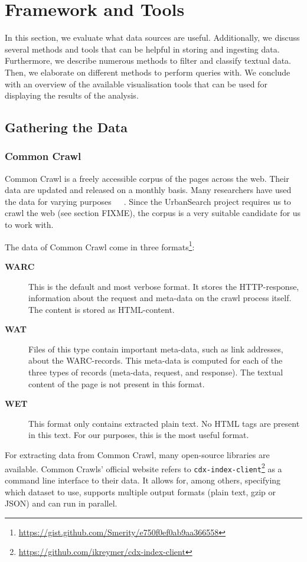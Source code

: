 \section{Framework and Tools}
In this section, we evaluate what data sources are useful. Additionally, we discuss several methods and tools that can be helpful in storing and ingesting data. Furthermore, we describe numerous methods to filter and classify textual data. Then, we elaborate on different methods to perform queries with. We conclude with an overview of the available visualisation tools that can be used for displaying the results of the analysis.

\subsection{Gathering the Data}

\subsubsection{Common Crawl}
Common Crawl \cite{commoncrawl} is a freely accessible corpus of the pages across the web. Their data are updated and released on a monthly basis. Many researchers have used the data for varying purposes~\cite{smith2013dirt}~\cite{muhleisen2012web}~\cite{singh2012wikilinks}. Since the UrbanSearch project requires us to crawl the web (see section {\color{red} FIXME}), the corpus is a very suitable candidate for us to work with.

The data of Common Crawl come in three formats\footnote{\url{https://gist.github.com/Smerity/e750f0ef0ab9aa366558}}: 
\begin{description}
\item[\textbf{WARC}] This is the default and most verbose format. It stores the HTTP-response, information about the request and meta-data on the crawl process itself. The content is stored as HTML-content.
\item[\textbf{WAT}] Files of this type contain important meta-data, such as link addresses, about the WARC-records. This meta-data is computed for each of the three types of records (meta-data, request, and response). The textual content of the page is not present in this format.
\item[\textbf{WET}] This format only contains extracted plain text. No HTML tags are present in this text. For our purposes, this is the most useful format.
\end{description}

For extracting data from Common Crawl, many open-source libraries are available. Common Crawls' official website refers to \texttt{cdx-index-client}\footnote{\url{https://github.com/ikreymer/cdx-index-client}} as a command line interface to their data. It allows for, among others, specifying which dataset to use, supports multiple output formats (plain text, gzip or JSON) and can run in parallel.

